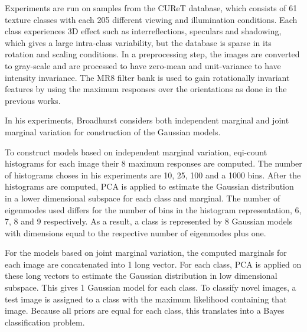 Experiments are run on samples from the CUReT database, which consists of 61 texture classes with each 205 different viewing and illumination conditions. Each class experiences 3D effect such as interreflections, speculars and shadowing, which gives a large intra-class variability, but the database is sparse in its rotation and scaling conditions. In a preprocessing step, the images are converted to gray-scale and are processed to have zero-mean and unit-variance to have intensity invariance. The MR8 filter bank is used to gain rotationally invariant features by using the maximum responses over the orientations as done in the previous works.


In his experiments, Broadhurst considers both independent marginal and joint marginal variation for construction of the Gaussian models. 

To construct models based on independent marginal variation, eqi-count histograms for each image their 8 maximum responses are computed. The number of histograms choses in his experiments are 10, 25, 100 and a 1000 bins. After the histograms are computed, PCA is applied to estimate the Gaussian distribution in a lower dimensional subspace for each class and marginal. The number of eigenmodes used differs for the number of bins in the histogram representation, 6, 7, 8 and 9 respectively. As a result, a class is represented by 8 Gaussian models with dimensions equal to the respective number of eigenmodes plus one. 

For the models based on joint marginal variation, the computed marginals for each image are concatenated into 1 long vector. For each class, PCA is applied on these long vectors to estimate the Gaussian distribution in low dimensional subspace. This gives 1 Gaussian model for each class. To classify novel images, a test image is assigned to a class with the maximum likelihood containing that image. Because all priors are equal for each class, this translates into a Bayes classification problem.

